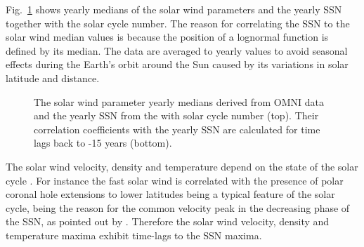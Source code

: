 Fig.~\ref{fig:OMNI_yearly_ssn_correlation_c_plot} shows yearly medians of the solar wind parameters and the yearly SSN together with the solar cycle number. The reason for correlating the SSN to the solar wind median values is because the position of a lognormal function is defined by its median. The data are averaged to yearly values to avoid seasonal effects during the Earth’s orbit around the Sun caused by its variations in solar latitude and distance.
\begin{figure}
	\caption{The solar wind parameter yearly medians derived from OMNI data and the yearly SSN from the \citet{sidc} with solar cycle number (top). Their correlation coefficients with the yearly SSN are calculated for time lags back to -15 years (bottom).}
	\label{fig:OMNI_yearly_ssn_correlation_c_plot}
\end{figure}

The solar wind velocity, density and temperature depend on the state of the solar cycle \citep{Schwenn1983}. %
For instance the fast solar wind is correlated with the presence of polar coronal hole extensions to lower latitudes being a typical feature of the solar cycle, being the reason for the common velocity peak in the decreasing phase of the SSN, as pointed out by \citet[p.~75, Figure~3.52]{Bothmer2007}. Therefore the solar wind velocity, density and temperature maxima exhibit time-lags to the SSN maxima.


